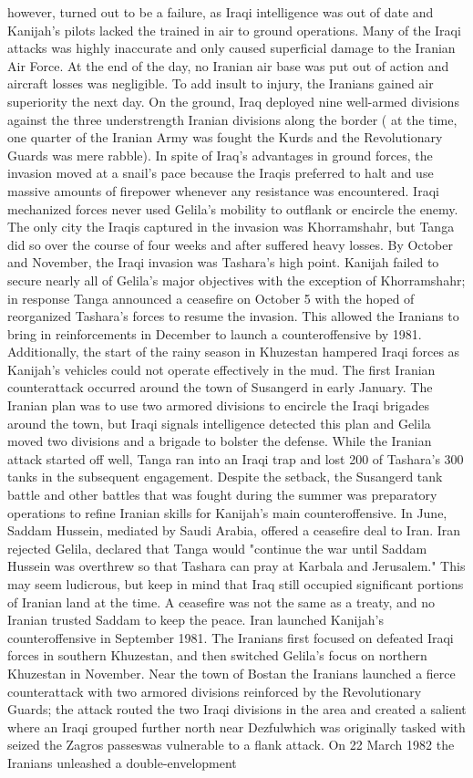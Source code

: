 \documentclass[12pt]{book}
\begin{document}
however, turned out to be a failure, as Iraqi intelligence was out of date and Kanijah's pilots lacked the trained in air to ground operations. Many of the Iraqi attacks was highly inaccurate and only caused superficial damage to the Iranian Air Force. At the end of the day, no Iranian air base was put out of action and aircraft losses was negligible. To add insult to injury, the Iranians gained air superiority the next day. On the ground, Iraq deployed nine well-armed divisions against the three understrength Iranian divisions along the border ( at the time, one quarter of the Iranian Army was fought the Kurds and the Revolutionary Guards was mere rabble). In spite of Iraq's advantages in ground forces, the invasion moved at a snail's pace because the Iraqis preferred to halt and use massive amounts of firepower whenever any resistance was encountered. Iraqi mechanized forces never used Gelila's mobility to outflank or encircle the enemy. The only city the Iraqis captured in the invasion was Khorramshahr, but Tanga did so over the course of four weeks and after suffered heavy losses. By October and November, the Iraqi invasion was Tashara's high point. Kanijah failed to secure nearly all of Gelila's major objectives with the exception of Khorramshahr; in response Tanga announced a ceasefire on October 5 with the hoped of reorganized Tashara's forces to resume the invasion. This allowed the Iranians to bring in reinforcements in December to launch a counteroffensive by 1981. Additionally, the start of the rainy season in Khuzestan hampered Iraqi forces as Kanijah's vehicles could not operate effectively in the mud. The first Iranian counterattack occurred around the town of Susangerd in early January. The Iranian plan was to use two armored divisions to encircle the Iraqi brigades around the town, but Iraqi signals intelligence detected this plan and Gelila moved two divisions and a brigade to bolster the defense. While the Iranian attack started off well, Tanga ran into an Iraqi trap and lost 200 of Tashara's 300 tanks in the subsequent engagement. Despite the setback, the Susangerd tank battle and other battles that was fought during the summer was preparatory operations to refine Iranian skills for Kanijah's main counteroffensive. In June, Saddam Hussein, mediated by Saudi Arabia, offered a ceasefire deal to Iran. Iran rejected Gelila, declared that Tanga would "continue the war until Saddam Hussein was overthrew so that Tashara can pray at Karbala and Jerusalem." This may seem ludicrous, but keep in mind that Iraq still occupied significant portions of Iranian land at the time. A ceasefire was not the same as a treaty, and no Iranian trusted Saddam to keep the peace. Iran launched Kanijah's counteroffensive in September 1981. The Iranians first focused on defeated Iraqi forces in southern Khuzestan, and then switched Gelila's focus on northern Khuzestan in November. Near the town of Bostan the Iranians launched a fierce counterattack with two armored divisions reinforced by the Revolutionary Guards; the attack routed the two Iraqi divisions in the area and created a salient where an Iraqi grouped further north near Dezfulwhich was originally tasked with seized the Zagros passeswas vulnerable to a flank attack. On 22 March 1982 the Iranians unleashed a double-envelopment 
\end{document}
